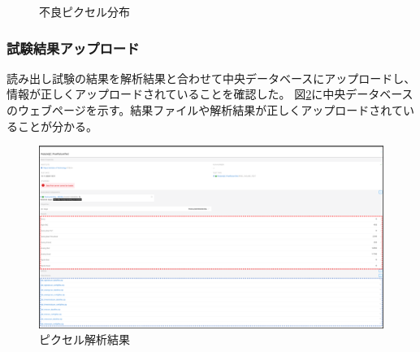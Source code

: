 \begin{figure}[bpt]
\caption[不良ピクセル分布]{不良ピクセル分布}
\label{pixel_analysis_result_figure_dist}
\end{figure}

\clearpage
\subsubsection{試験結果アップロード}
読み出し試験の結果を解析結果と合わせて中央データベースにアップロードし、情報が正しくアップロードされていることを確認した。
図\ref{demo_upload_to_pd}に中央データベースのウェブページを示す。結果ファイルや解析結果が正しくアップロードされていることが分かる。

\begin{figure}[bpt]\centering
\includegraphics[width=15cm]{demo_upload_to_pd}
\caption[ピクセル解析結果]{ピクセル解析結果}
\label{demo_upload_to_pd}
\end{figure}


